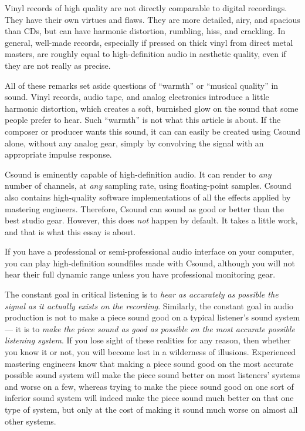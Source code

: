 \documentclass[english,11pt,letterpaper,onecolumn]{scrartcl}
\begin{document}
Vinyl records of high quality are not directly comparable to digital 
recordings. They have their own virtues and flaws. They are more detailed, 
airy, and spacious than CDs, but can have harmonic distortion, rumbling, hiss, 
and crackling.  In general, well-made records, especially if pressed 
on thick vinyl from direct metal masters, are roughly equal to high-definition 
audio in aesthetic quality, even if they are not really as precise. 

All of these remarks set aside questions of ``warmth'' or ``musical quality'' 
in sound. Vinyl records, audio tape, and analog electronics introduce a little 
harmonic distortion, which creates a soft, burnished glow on the sound that 
some people prefer to hear. Such ``warmth'' is not what this article is about. 
If the composer or producer wants this sound, it can can easily be created 
using Csound alone, without any analog gear, simply by convolving the signal 
with an appropriate impulse response.

Csound is eminently capable of high-definition audio. It can render to 
\emph{any} number of channels, at \emph{any} sampling rate, using 
floating-point samples. Csound also contains high-quality software 
implementations of all the effects applied by mastering engineers. Therefore, 
Csound can sound as good or better than the best studio gear. However, this 
does \emph{not} happen by default. It takes a little work, and that is what this 
essay is about.

If you have a professional or semi-professional audio interface on your 
computer, you can play high-definition soundfiles made with Csound, although 
you will not hear their full dynamic range unless you have professional 
monitoring gear.

The constant goal in critical listening is to \emph{hear as accurately as 
possible the signal as it actually exists on the recording}. Similarly, the 
constant goal in audio production is not to make a piece sound good on a 
typical listener's sound system --- it is to \emph{make the piece sound as 
good as possible on the most accurate possible listening system}. If you lose 
sight of these realities for any reason, then whether you know it or not, you 
will become lost in a wilderness of illusions. Experienced mastering engineers 
know that making a piece sound good on the most accurate possible sound system 
will make the piece sound better on most listeners' systems and worse on a 
few, whereas trying to make the piece sound good on one sort of inferior sound 
system will indeed make the piece sound much better on that one type of 
system, but only at the cost of making it sound much worse on almost all other 
systems.
\end{document}
